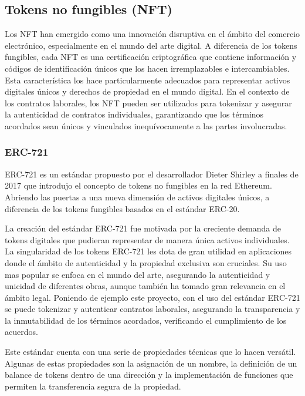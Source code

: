 \subsection{Tokens no fungibles (NFT)}

Los NFT han emergido como una innovación disruptiva en el ámbito del comercio electrónico, especialmente en el mundo del arte digital.
A diferencia de los tokens fungibles, cada NFT es una certificación criptográfica que contiene información y códigos de identificación únicos que los hacen irremplazables e intercambiables.
Esta característica los hace particularmente adecuados para representar activos digitales únicos y derechos de propiedad en el mundo digital.
En el contexto de los contratos laborales, los NFT pueden ser utilizados para tokenizar y asegurar la autenticidad de contratos individuales, garantizando que los términos acordados sean únicos y vinculados inequívocamente a las partes involucradas.~\cite{NFTintroducción}


\subsubsection{ERC-721}

ERC-721 es un estándar propuesto por el desarrollador Dieter Shirley a finales de 2017 que introdujo el concepto de tokens no fungibles en la red Ethereum. ~\cite{ERC721Introducción}
Abriendo las puertas a una nueva dimensión de activos digitales únicos, a diferencia de los tokens fungibles basados en el estándar ERC-20.

La creación del estándar ERC-721 fue motivada por la creciente demanda de tokens digitales que pudieran representar de manera única activos individuales.
La singularidad de los tokens ERC-721 les dota de gran utilidad en aplicaciones donde el ámbito de autenticidad y la propiedad exclusiva son cruciales.
Su uso mas popular se enfoca en el mundo del arte, asegurando la autenticidad y unicidad de diferentes obras, aunque también ha tomado gran relevancia en el ámbito legal. 
Poniendo de ejemplo este proyecto, con el uso del estándar ERC-721 se puede tokenizar y autenticar contratos laborales, asegurando la transparencia y la inmutabilidad de los términos acordados, verificando el cumplimiento de los acuerdos.

Este estándar cuenta con una serie de propiedades técnicas que lo hacen versátil. Algunas de estas propiedades son la asignación de un nombre, la definición de un balance de tokens dentro de una dirección y la implementación de funciones que permiten la transferencia segura de la propiedad.

